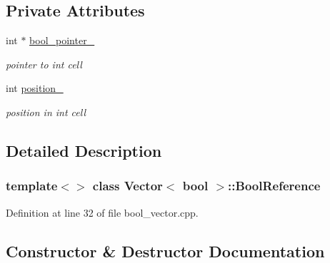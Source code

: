 \subsection*{Private Attributes}
\begin{DoxyCompactItemize}
\item 
\mbox{\label{classVector_3_01bool_01_4_1_1BoolReference_ad9fc66c2a80d7351e5829e321c4d46f0}} 
int $\ast$ \hyperlink{classVector_3_01bool_01_4_1_1BoolReference_ad9fc66c2a80d7351e5829e321c4d46f0}{bool\+\_\+pointer\+\_\+}
\begin{DoxyCompactList}\small\item\em pointer to int cell \end{DoxyCompactList}\item 
\mbox{\label{classVector_3_01bool_01_4_1_1BoolReference_a88f229e6c448c4e7f34381247eb7f2b8}} 
int \hyperlink{classVector_3_01bool_01_4_1_1BoolReference_a88f229e6c448c4e7f34381247eb7f2b8}{position\+\_\+}
\begin{DoxyCompactList}\small\item\em position in int cell \end{DoxyCompactList}\end{DoxyCompactItemize}


\subsection{Detailed Description}
\subsubsection*{template$<$$>$\newline
class Vector$<$ bool $>$\+::\+Bool\+Reference}



Definition at line 32 of file bool\+\_\+vector.\+cpp.



\subsection{Constructor \& Destructor Documentation}
\mbox{\label{classVector_3_01bool_01_4_1_1BoolReference_a7b319cb4b874379cbeb6d303b5d323eb}} 
